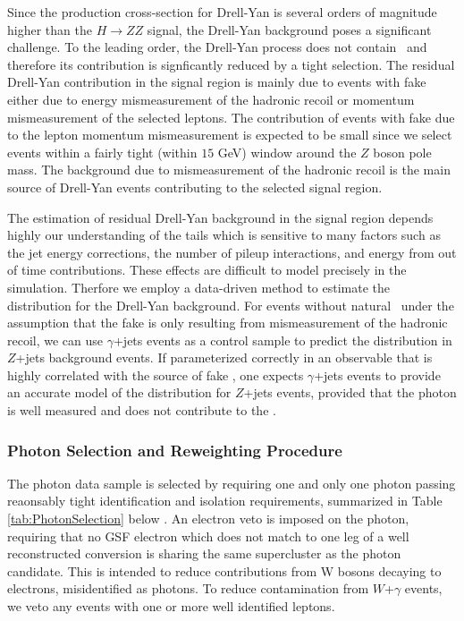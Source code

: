 Since the production cross-section for Drell-Yan is several orders of magnitude 
higher than the $H \to ZZ$ signal, the Drell-Yan background poses a significant 
challenge. To the leading order, the Drell-Yan process does not contain \met\,  
and therefore its contribution is signficantly reduced by a tight \met selection. 
The residual Drell-Yan contribution in the signal region 
is mainly due to events with fake \met either due to energy mismeasurement of  
the hadronic recoil or momentum mismeasurement of the selected leptons. 
The contribution of events with fake \met due to the lepton momentum mismeasurement 
is expected to be small since we select events within a fairly tight (within $15$ GeV) window 
around the $Z$ boson pole mass. The background due to mismeasurement of the hadronic
recoil is the main source of Drell-Yan events contributing to the selected signal region.

The estimation of residual Drell-Yan background in the signal region depends highly 
our understanding of the \met tails which is sensitive to many factors such as 
the jet energy corrections, the number of pileup interactions, and energy from out of time
contributions. These effects are difficult to model precisely in the simulation.
Therfore we employ a data-driven method to estimate the \met distribution for the 
Drell-Yan background. For events without natural \met\, under the assumption that 
the fake \met is only resulting from mismeasurement of the hadronic recoil, we can use
$\gamma$+jets events as a control sample to predict the \met distribution in $Z$+jets
background events. If parameterized correctly in an observable that is highly correlated 
with the source of fake \met, one expects $\gamma$+jets events to provide an accurate
model of the \met distribution for $Z$+jets events, provided that the photon
is well measured and does not contribute to the \met.

\subsubsection{Photon Selection and Reweighting Procedure}
The photon data sample is selected by requiring one and only one photon passing reaonsably tight
identification and isolation requirements, summarized in Table \ref{tab:PhotonSelection} below 
\cite{MITHggNote}. 
An electron veto is imposed on the photon, requiring that no GSF electron which does not match to 
one leg of a well reconstructed conversion is sharing the same supercluster as the photon
candidate. This is intended to reduce contributions from W bosons decaying to electrons, misidentified
as photons. To reduce contamination from $W$+$\gamma$ events, we veto any events with one or 
more well identified leptons.


